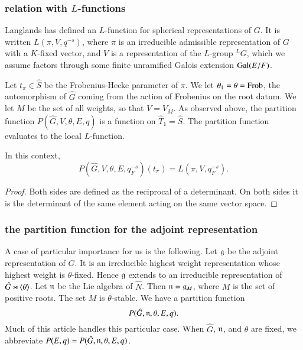 \subsubsection{relation with $L$-functions}

Langlands has defined an $L$-function for spherical representations of
$G$.  It is written $L(\pi,V,q^{-s})$, where $\pi$ is an irreducible
admissible representation of $G$ with a $K$-fixed vector, and $V$ is a
representation of the $L$-group ${}^LG$, which we assume factors
through some finite unramified Galois extension ${\operatorname{Gal}}(E/F)$.

Let $t_\pi\in \hat S$ be the Frobenius-Hecke parameter of $\pi$.  We
let $\theta_1 = \theta = {\operatorname{Frob}}$, the automorphism of $\hat G$ coming
from the action of Frobenius on the root datum.  We let $M$ be the set
of all weights, so that $V = V_M$.  As observed above, the partition
function $P(\hat G,V,\theta,E,q)$ is a function on $\hat T_1 = \hat
S$.  The partition function evaluates to the local $L$-function.

\begin{lemma} In this context,
\[
P(\hat G,V,\theta,E,q_F^{-s})(t_\pi) = L(\pi,V,q_F^{-s}).
\]
\end{lemma}

\begin{proof} Both sides are defined as the reciprocal of a
  determinant.  On both sides it is the determinant of the same
  element acting on the same vector space.
\end{proof}

\subsubsection{the partition function for the adjoint representation}\label{sec:adjoint}

A case of particular importance for us is the following.  Let ${\mathfrak g}$ be
the adjoint representation of $\hat G$.  It is an irreducible highest
weight representation whose highest weight is $\theta$-fixed.  Hence
${\mathfrak g}$ extends to an irreducible representation of $\hat
G\rtimes\langle{\theta}\rangle$.  Let ${\mathfrak n}$ be the Lie algebra of $\hat N$.  Then
${\mathfrak n} = {\mathfrak g}_M$, where $M$ is the set of positive roots.  The set $M$ is
$\theta$-stable.  We have a partition function
\[
P(\hat G,{\mathfrak n},\theta,E,q).
\]
Much of this article handles this particular case.  When $\hat G$,
${\mathfrak n}$, and $\theta$ are fixed, we abbreviate $P(E,q) = P(\hat
G,{\mathfrak n},\theta,E,q)$.


